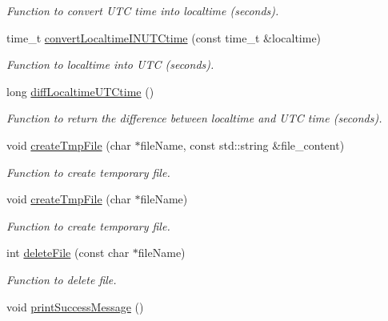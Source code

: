 \begin{DoxyCompactItemize}
\begin{DoxyCompactList}\small\item\em Function to convert UTC time into localtime (seconds). \item\end{DoxyCompactList}\item 
time\_\-t \hyperlink{namespacevishnu_a7607f0891ab382dcb2343a36d9b25190}{convertLocaltimeINUTCtime} (const time\_\-t \&localtime)
\begin{DoxyCompactList}\small\item\em Function to localtime into UTC (seconds). \item\end{DoxyCompactList}\item 
long \hyperlink{namespacevishnu_a34f4596f7c86c2f9bd6b6bd49be69e6f}{diffLocaltimeUTCtime} ()
\begin{DoxyCompactList}\small\item\em Function to return the difference between localtime and UTC time (seconds). \item\end{DoxyCompactList}\item 
void \hyperlink{namespacevishnu_a33f3fca5bc294663e2863c1abc1da5c8}{createTmpFile} (char $\ast$fileName, const std::string \&file\_\-content)
\begin{DoxyCompactList}\small\item\em Function to create temporary file. \item\end{DoxyCompactList}\item 
void \hyperlink{namespacevishnu_a18002572e5b0039069544475365f335d}{createTmpFile} (char $\ast$fileName)
\begin{DoxyCompactList}\small\item\em Function to create temporary file. \item\end{DoxyCompactList}\item 
int \hyperlink{namespacevishnu_adccbbcf352ca9471d210e9d801c73e2d}{deleteFile} (const char $\ast$fileName)
\begin{DoxyCompactList}\small\item\em Function to delete file. \item\end{DoxyCompactList}\item 
\hypertarget{namespacevishnu_ab0ea8ccb86c430f6a602374c82f66d2e}{
void \hyperlink{namespacevishnu_ab0ea8ccb86c430f6a602374c82f66d2e}{printSuccessMessage} ()}
\label{namespacevishnu_ab0ea8ccb86c430f6a602374c82f66d2e}


\end{DoxyCompactItemize}
